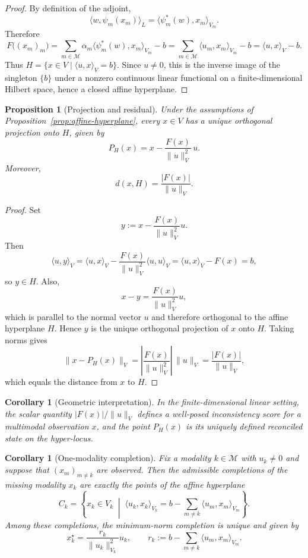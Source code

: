 \documentclass[11pt]{article}
\newtheorem{proposition}[definition]{Proposition}
\newtheorem{corollary}[definition]{Corollary}
\begin{document}
\begin{proof}
By definition of the adjoint,
\[
\langle w,\psi_m(x_m)\rangle_L = \langle \psi_m^*(w),x_m\rangle_{V_m}.
\]
Therefore
\[
F\bigl((x_m)_m\bigr)
=
\sum_{m\in\mathcal{M}}\alpha_m\langle \psi_m^*(w),x_m\rangle_{V_m}-b
=
\sum_{m\in\mathcal{M}}\langle u_m,x_m\rangle_{V_m}-b
=
\langle u,x\rangle_V-b.
\]
Thus $H=\{x\in V\mid \langle u,x\rangle_V=b\}$. Since $u\neq 0$, this is the inverse image of the singleton $\{b\}$ under a nonzero continuous linear functional on a finite-dimensional Hilbert space, hence a closed affine hyperplane.
\end{proof}

\begin{proposition}[Projection and residual]\label{prop:projection}
Under the assumptions of Proposition~\ref{prop:affine-hyperplane}, every $x\in V$ has a unique orthogonal projection onto $H$, given by
\[
P_H(x)=x-\frac{F(x)}{\|u\|_V^2}\,u.
\]
Moreover,
\[
d(x,H)=\frac{|F(x)|}{\|u\|_V}.
\]
\end{proposition}

\begin{proof}
Set
\[
y:=x-\frac{F(x)}{\|u\|_V^2}u.
\]
Then
\[
\langle u,y\rangle_V
=
\langle u,x\rangle_V-\frac{F(x)}{\|u\|_V^2}\langle u,u\rangle_V
=
\langle u,x\rangle_V-F(x)
=
b,
\]
so $y\in H$. Also,
\[
x-y=\frac{F(x)}{\|u\|_V^2}u,
\]
which is parallel to the normal vector $u$ and therefore orthogonal to the affine hyperplane $H$. Hence $y$ is the unique orthogonal projection of $x$ onto $H$. Taking norms gives
\[
\|x-P_H(x)\|_V = \left|\frac{F(x)}{\|u\|_V^2}\right|\,\|u\|_V = \frac{|F(x)|}{\|u\|_V},
\]
which equals the distance from $x$ to $H$.
\end{proof}

\begin{corollary}[Geometric interpretation]\label{cor:interpretation}
In the finite-dimensional linear setting, the scalar quantity $|F(x)|/\|u\|_V$ defines a well-posed \emph{inconsistency score} for a multimodal observation $x$, and the point $P_H(x)$ is its uniquely defined \emph{reconciled state} on the hyper-locus.
\end{corollary}

\begin{corollary}[One-modality completion]\label{cor:completion}
Fix a modality $k\in\mathcal{M}$ with $u_k\neq 0$ and suppose that $(x_m)_{m\neq k}$ are observed. Then the admissible completions of the missing modality $x_k$ are exactly the points of the affine hyperplane
\[
C_k=\left\{x_k\in V_k\;\middle|\;\langle u_k,x_k\rangle_{V_k}=b-\sum_{m\neq k}\langle u_m,x_m\rangle_{V_m}\right\}.
\]
Among these completions, the minimum-norm completion is unique and given by
\[
x_k^{\star}=\frac{r_k}{\|u_k\|_{V_k}^2}u_k,
\qquad
r_k:=b-\sum_{m\neq k}\langle u_m,x_m\rangle_{V_m}.
\]
\end{corollary}
\end{document}
